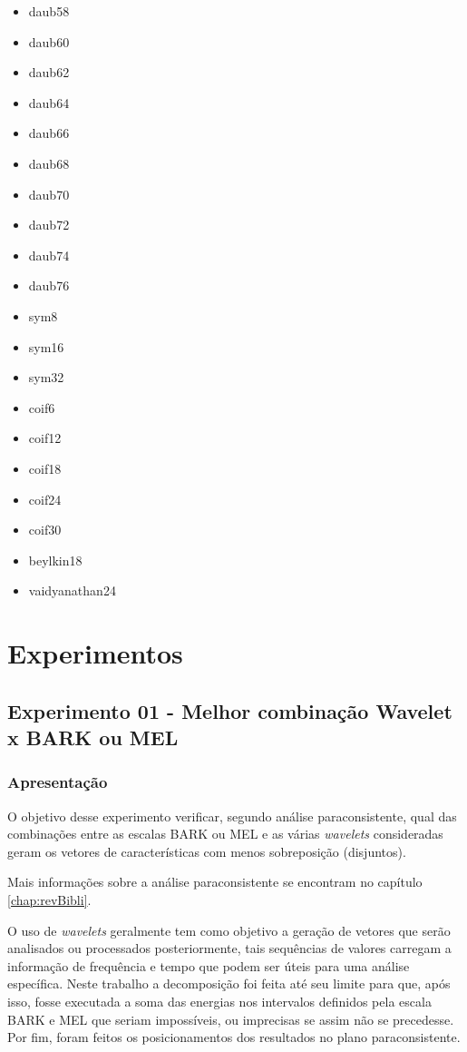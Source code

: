 \begin{myenv}{1.5}
\begin{multicols}{5}
\begin{itemize}
						\item daub58	\item daub60	\item daub62	\item daub64
						\item daub66	\item daub68	\item daub70	\item daub72
						\item daub74	\item daub76	\item sym8		\item sym16
						\item sym32		\item coif6		\item coif12	\item coif18
						\item coif24	\item coif30	\item beylkin18	\item vaidyanathan24
					\end{itemize}
				\end{multicols}

		\section{Experimentos}
			\subsection{Experimento 01 - Melhor combinação Wavelet x BARK ou MEL}
			\label{chap:propApproach:sec:Experimento01}
				\subsubsection{Apresentação}
					\par O objetivo desse experimento verificar, segundo análise paraconsistente, qual das combinações entre as escalas BARK ou MEL e as várias \textit{wavelets} consideradas geram os vetores de características com menos sobreposição (disjuntos).
					
					\par Mais informações sobre a análise paraconsistente se encontram no capítulo \ref{chap:revBibli}. 
					
					\par O uso de \textit{wavelets} geralmente tem como objetivo a geração de vetores que serão analisados ou processados posteriormente, tais sequências de valores carregam a informação de frequência e tempo que podem ser úteis para uma análise específica. Neste trabalho a decomposição foi feita até seu limite  para que, após isso, fosse executada a soma das energias nos intervalos definidos pela escala BARK e MEL que seriam impossíveis, ou imprecisas se assim não se precedesse. Por fim, foram  feitos os posicionamentos dos resultados no plano paraconsistente.
					

\end{myenv}
